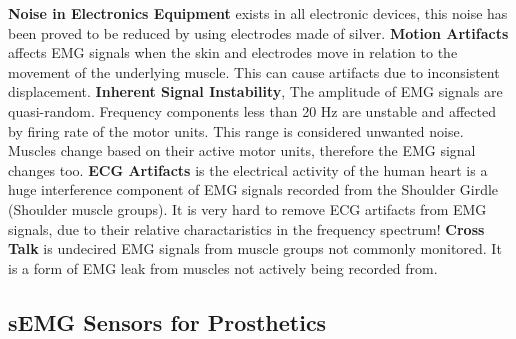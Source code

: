 \documentclass[../main.tex]{subfiles}
\begin{document}
\textbf{Noise in Electronics Equipment} exists in all electronic devices, this noise has been proved to be reduced by using electrodes made of silver.
\textbf{Motion Artifacts} affects EMG signals when the skin and electrodes move in relation to the movement of the underlying muscle.
This can cause artifacts due to inconsistent displacement.
\textbf{Inherent Signal Instability}, The amplitude of EMG signals are quasi-random. Frequency components less than 20 Hz are unstable and affected by firing rate of the motor units. This range is considered unwanted noise. Muscles change based on their active motor units, therefore the EMG signal changes too.
\textbf{ECG Artifacts} is the electrical activity of the human heart is a huge interference component of EMG signals recorded from the Shoulder Girdle (Shoulder muscle groups).
It is very hard to remove ECG artifacts from EMG signals, due to their relative charactaristics in the frequency spectrum!
\textbf{Cross Talk} is undecired EMG signals from muscle groups not commonly monitored.
It is a form of EMG leak from muscles not actively being recorded from.


\subsection{sEMG Sensors for Prosthetics}
\end{document}

